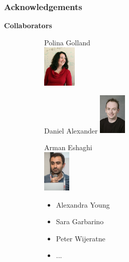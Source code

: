 \documentclass[10pt,xcolor=table,aspectratio=169]{beamer}
\begin{document}
\begin{frame}
 \frametitle{Acknowledgements}



\textbf{Collaborators}
\begin{figure}
\begin{subfigure}{0.2\textwidth}
\centering
Polina Golland\\

\includegraphics[height=2cm]{images/polina} 
\end{subfigure}
\begin{subfigure}{0.2\textwidth}
\centering
Daniel Alexander
\includegraphics[height=2cm]{images/danny} 
\end{subfigure}
\begin{subfigure}{0.2\textwidth}
\centering
Arman Eshaghi\\
 
\includegraphics[height=2cm]{images/arman} 
\end{subfigure}
\begin{subfigure}{0.2\textwidth}
 \begin{itemize}
  \item Alexandra Young
  \item Sara Garbarino
  \item Peter Wijeratne
  \item ...
 \end{itemize}
\end{subfigure}




\end{figure}
\end{frame}
\end{document}
